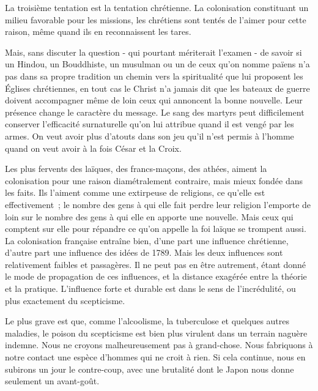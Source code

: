 \documentclass[french,twoside]{book} %
\begin{document}
La troisième tentation est la tentation chrétienne. La colonisation consti­tuant un milieu favorable pour les missions, les chrétiens sont tentés de l'aimer pour cette raison, même quand ils en reconnaissent les tares.\par
Mais, sans discuter la question - qui pourtant mériterait l'examen - de savoir si un Hindou, un Bouddhiste, un musulman ou un de ceux qu'on nomme païens n'a pas dans sa propre tradition un chemin vers la spiritualité que lui proposent les Églises chrétiennes, en tout cas le Christ n'a jamais dit que les bateaux de guerre doivent accompagner même de loin ceux qui annoncent la bonne nouvelle. Leur présence change le caractère du message. Le sang des martyrs peut difficilement conserver l'efficacité surnaturelle qu'on lui attribue quand il est vengé par les armes. On veut avoir plus d'atouts dans son jeu qu'il n'est permis à l'homme quand on veut avoir à la fois César et la Croix.\par
Les plus fervents des laïques, des francs-maçons, des athées, aiment la colonisation pour une raison diamétralement contraire, mais mieux fondée dans les faits. Ils l'aiment comme une extirpeuse de religions, ce qu'elle est effectivement ; le nombre des gens à qui elle fait perdre leur religion l'emporte de loin sur le nombre des gens à qui elle en apporte une nouvelle. Mais ceux qui comptent sur elle pour répandre ce qu'on appelle la foi laïque se trompent aussi. La colonisation française entraîne bien, d'une part une influence chré­tienne, d'autre part une influence des idées de 1789. Mais les deux influences sont relativement faibles et passagères. Il ne peut pas en être autrement, étant donné le mode de propagation de ces influences, et la distance exagérée entre la théorie et la pratique. L'influence forte et durable est dans le sens de l'incrédulité, ou plus exactement du scepticisme.\par
Le plus grave est que, comme l'alcoolisme, la tuberculose et quelques autres maladies, le poison du scepticisme est bien plus virulent dans un terrain naguère indemne. Nous ne croyons malheureusement pas à grand-chose. Nous fabriquons à notre contact une espèce d'hommes qui ne croit à rien. Si cela continue, nous en subirons un jour le contre-coup, avec une brutalité dont le Japon nous donne seulement un avant-goût.\par
\end{document}
